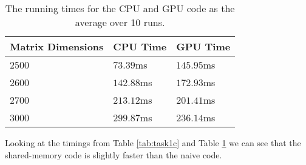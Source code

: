 \begin{table}
    \begin{tabular}{|l|l|l|}
        \hline
        \textbf{Matrix Dimensions} & \textbf{CPU Time} & \textbf{GPU Time} \\\hline
        2500 &  $73.39$ms & $145.95$ms \\
        2600 & $142.88$ms & $172.93$ms \\
        2700 & $213.12$ms & $201.41$ms \\
        3000 & $299.87$ms & $236.14$ms \\\hline
    \end{tabular}
    \caption{The running times for the CPU and GPU code as the average over 10
    runs.}
    \label{tab:task1d}
\end{table}

Looking at the timings from Table \ref{tab:task1c} and Table \ref{tab:task1d} we
can see that the shared-memory code is slightly faster than the naive code.
